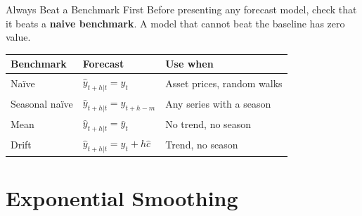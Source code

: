 \documentclass[aspectratio=169, 11pt]{beamer}
\begin{document}
\begin{frame}{Always Beat a Benchmark First}
  Before presenting any forecast model, check that it beats a \textbf{naive
  benchmark}. A model that cannot beat the baseline has zero value.
  \begin{center}
    {\small
    \begin{tabular}{llp{6.2cm}}
      \toprule
      \textbf{Benchmark} & \textbf{Forecast} & \textbf{Use when} \\
      \midrule
      Na\"{i}ve          & $\hat{y}_{t+h|t} = y_t$            & Asset prices, random walks \\
      Seasonal na\"{i}ve & $\hat{y}_{t+h|t} = y_{t+h-m}$      & Any series with a season \\
      Mean               & $\hat{y}_{t+h|t} = \bar{y}_t$      & No trend, no season \\
      Drift              & $\hat{y}_{t+h|t} = y_t + h\hat{c}$ & Trend, no season \\
      \bottomrule
    \end{tabular}
    }
  \end{center}
  \vspace{0.1cm}
\end{frame}

\section{Exponential Smoothing}

\end{document}
